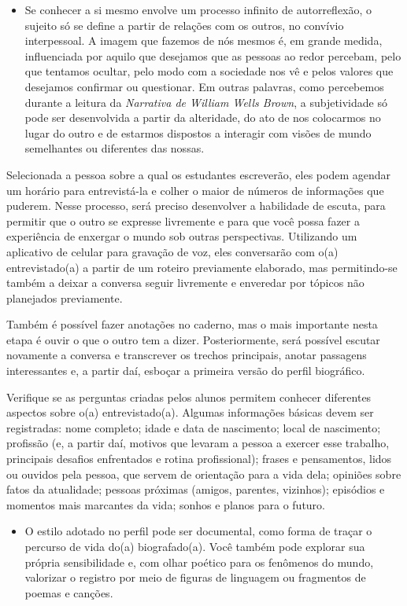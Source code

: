 \documentclass[11pt]{extarticle}
\begin{document}
\begin{itemize}
\item
  Se conhecer a si mesmo envolve um processo infinito de autorreflexão,
  o sujeito só se define a partir de relações com os outros, no convívio
  interpessoal. A imagem que fazemos de nós mesmos é, em grande medida,
  influenciada por aquilo que desejamos que as pessoas ao redor
  percebam, pelo que tentamos ocultar, pelo modo com a sociedade nos vê
  e pelos valores que desejamos confirmar ou questionar. Em outras
  palavras, como percebemos durante a leitura da \emph{Narrativa de
  William Wells Brown}, a subjetividade só pode ser desenvolvida a
  partir da alteridade, do ato de nos colocarmos no lugar do outro e de
  estarmos dispostos a interagir com visões de mundo semelhantes ou
  diferentes das nossas.
\end{itemize}

Selecionada a pessoa sobre a qual os estudantes escreverão, eles podem
agendar um horário para entrevistá-la e colher o maior de números de
informações que puderem. Nesse processo, será preciso desenvolver a
habilidade de escuta, para permitir que o outro se expresse livremente e
para que você possa fazer a experiência de enxergar o mundo sob outras
perspectivas. Utilizando um aplicativo de celular para gravação de voz,
eles conversarão com o(a) entrevistado(a) a partir de um roteiro
previamente elaborado, mas permitindo-se também a deixar a conversa
seguir livremente e enveredar por tópicos não planejados previamente.

Também é possível fazer anotações no caderno, mas o mais importante
nesta etapa é ouvir o que o outro tem a dizer. Posteriormente, será
possível escutar novamente a conversa e transcrever os trechos
principais, anotar passagens interessantes e, a partir daí, esboçar a
primeira versão do perfil biográfico.

Verifique se as perguntas criadas pelos alunos permitem conhecer
diferentes aspectos sobre o(a) entrevistado(a). Algumas informações
básicas devem ser registradas: nome completo; idade e data de
nascimento; local de nascimento; profissão (e, a partir daí, motivos que
levaram a pessoa a exercer esse trabalho, principais desafios
enfrentados e rotina profissional); frases e pensamentos, lidos ou
ouvidos pela pessoa, que servem de orientação para a vida dela; opiniões
sobre fatos da atualidade; pessoas próximas (amigos, parentes,
vizinhos); episódios e momentos mais marcantes da vida; sonhos e planos
para o futuro.

\begin{itemize}
\item
  O estilo adotado no perfil pode ser documental, como forma de traçar o
  percurso de vida do(a) biografado(a). Você também pode explorar sua
  própria sensibilidade e, com olhar poético para os fenômenos do mundo,
  valorizar o registro por meio de figuras de linguagem ou fragmentos de
  poemas e canções.
\end{itemize}
\end{document}
